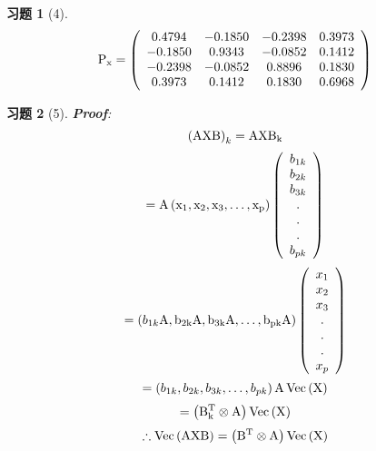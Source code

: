 \documentclass[12pt, oneside]{article}
\newtheorem*{exercise}{\textbf{习题}}
\begin{document}
  \begin{exercise}[4]
	\scriptsize
	\begin{equation*}
	  \rm{
		P_x = \left(
		\begin{array}{cccc}
		  0.4794 & -0.1850 & -0.2398 & 0.3973 \\
		  -0.1850 & 0.9343 & -0.0852 & 0.1412 \\
		  -0.2398 & -0.0852 & 0.8896 & 0.1830 \\
		  0.3973 & 0.1412 & 0.1830 & 0.6968 \\
		\end{array}
		\right)
	  }
	\end{equation*}
  \end{exercise}

  \begin{exercise}[5]
	\rm{
	  \textbf{Proof}:\\
	  \begin{equation*}
		\left( \rm{AXB} \right)_k = \rm{AXB}_k
	  \end{equation*}
	  \begin{equation*}
		= \rm{A} \left( x_1, x_2, x_3, \dots , x_p \right)
		\left(
		\begin{array}{c}
		  b_{1k} \\
		  b_{2k} \\
		  b_{3k} \\
		  . \\
		  . \\
		  . \\
		  b_{pk} \\
		\end{array}
		\right)
	  \end{equation*}
	  \begin{equation*}
		= \left( b_{1k}\rm{A}, b_{2k}\rm{A}, b_{3k}\rm{A}, \dots , b_{pk}\rm{A}\right) \left( 
		\begin{array}{c}
		  x_1 \\
		  x_2 \\
		  x_3 \\
		  . \\
		  . \\
		  . \\
		  x_p \\
		\end{array}
		\right)
		\end{equation*}
		\begin{equation*}
		  = \left( b_{1k}, b_{2k}, b_{3k}, \dots , b_{pk}\right)\rm{A}\operatorname{Vec}\left( \rm{X} \right)
		\end{equation*}
		\begin{equation*}
		  = \left( \rm{B}_k^T \otimes \rm{A} \right) \operatorname{Vec} \left( \rm{X} \right)
		  \end{equation*}
		  \begin{equation*}
			\therefore \operatorname{Vec}\left( \rm{AXB} \right)	= \left( \rm{B}^T \otimes \rm{A} \right) \operatorname{Vec} \left( \rm{X} \right)
		  \end{equation*}
		}
	  \end{exercise}
\end{document}
